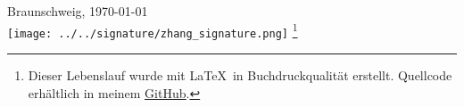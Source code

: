							
							\flushright
							\vspace{1em}
							Braunschweig, \today\\[1em]	 \texttt{[image: ../../signature/zhang\_signature.png]}
							\footnote{Dieser Lebenslauf wurde mit \LaTeX ~in Buchdruckqualität erstellt. Quellcode erhältlich in meinem \href{https://github.com/joywezen/}{\underline{GitHub}}.
							}	
								\clearpage
